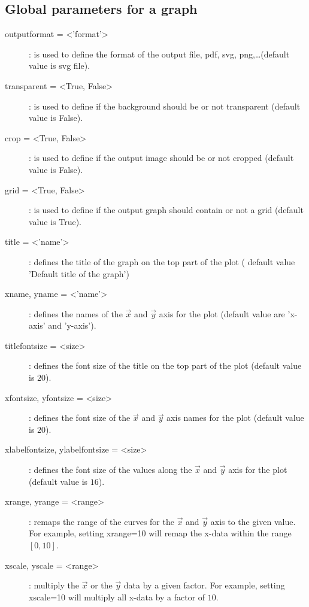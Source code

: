 \subsection{Global parameters for a graph}
\begin{description}
\item [outputformat = <'format'>]: is used to define the format of the output file, \ie pdf, svg, png,\ldots (default value is svg file).
\item [transparent = <True, False>]: is used to define if the background should be or not transparent (default value is False).
\item [crop = <True, False>]: is used to define if the output image should be or not cropped (default value is False).
\item [grid = <True, False>]: is used to define if the output graph should contain or not a grid (default value is True).
\item [title = <'name'>]: defines the title of the graph on the top part of the plot ( default value 'Default title of the graph')
\item [xname, yname = <'name'>]: defines the names of the $\overrightarrow{x}$ and $\overrightarrow{y}$ axis for the plot (default value are 'x-axis' and 'y-axis').
\item [titlefontsize = <size>]: defines the font size of the title on the top part of the plot (default value is $20$).
\item [xfontsize, yfontsize = <size>]: defines the font size of the $\overrightarrow{x}$ and $\overrightarrow{y}$ axis names for the plot (default value is $20$).
\item [xlabelfontsize, ylabelfontsize = <size>]: defines the font size of the values along the $\overrightarrow{x}$ and $\overrightarrow{y}$ axis for the plot (default value is $16$).
\item [xrange, yrange = <range>]: remaps the range of the curves for the $\overrightarrow{x}$ and $\overrightarrow{y}$ axis to the given value. For example, setting \textsf{xrange=10} will remap the x-data within the range $[0,10]$. 
\item [xscale, yscale = <range>]: multiply the $\overrightarrow{x}$ or the $\overrightarrow{y}$ data by a given factor. For example, setting \textsf{xscale=10} will multiply all x-data by a factor of $10$.
\end{description}

